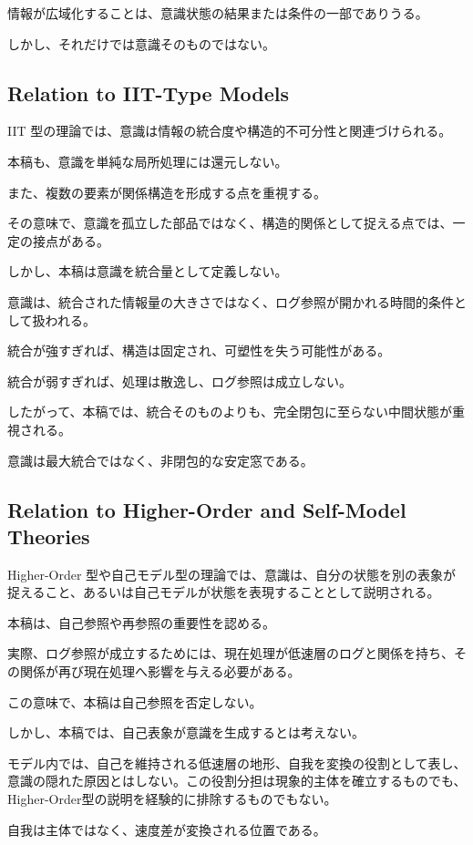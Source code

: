 情報が広域化することは、意識状態の結果または条件の一部でありうる。

しかし、それだけでは意識そのものではない。

\subsection{Relation to IIT-Type Models}

IIT 型の理論では、意識は情報の統合度や構造的不可分性と関連づけられる。

本稿も、意識を単純な局所処理には還元しない。

また、複数の要素が関係構造を形成する点を重視する。

その意味で、意識を孤立した部品ではなく、構造的関係として捉える点では、一定の接点がある。

しかし、本稿は意識を統合量として定義しない。

意識は、統合された情報量の大きさではなく、ログ参照が開かれる時間的条件として扱われる。

統合が強すぎれば、構造は固定され、可塑性を失う可能性がある。

統合が弱すぎれば、処理は散逸し、ログ参照は成立しない。

したがって、本稿では、統合そのものよりも、完全閉包に至らない中間状態が重視される。

意識は最大統合ではなく、非閉包的な安定窓である。

\subsection{Relation to Higher-Order and Self-Model Theories}

Higher-Order 型や自己モデル型の理論では、意識は、自分の状態を別の表象が捉えること、あるいは自己モデルが状態を表現することとして説明される。

本稿は、自己参照や再参照の重要性を認める。

実際、ログ参照が成立するためには、現在処理が低速層のログと関係を持ち、その関係が再び現在処理へ影響を与える必要がある。

この意味で、本稿は自己参照を否定しない。

しかし、本稿では、自己表象が意識を生成するとは考えない。

モデル内では、自己を維持される低速層の地形、自我を変換の役割として表し、意識の隠れた原因とはしない。この役割分担は現象的主体を確立するものでも、Higher-Order型の説明を経験的に排除するものでもない。

自我は主体ではなく、速度差が変換される位置である。

